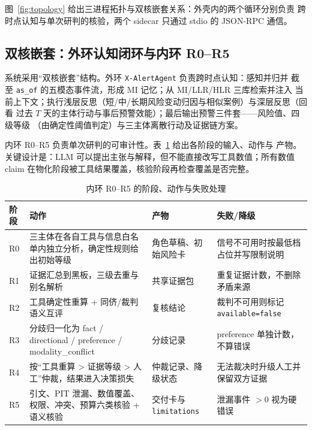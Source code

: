 \documentclass[UTF8,fontset=fandol,11pt,a4paper]{ctexart}
\begin{document}
图~\ref{fig:topology} 给出三进程拓扑与双核嵌套关系：外壳内的两个循环分别负责
跨时点认知与单次研判的核验，两个 sidecar 只通过 stdio 的 JSON-RPC 通信。

\subsection{双核嵌套：外环认知闭环与内环 R0--R5}

系统采用“双核嵌套”结构。外环 \texttt{X-AlertAgent} 负责跨时点认知：感知并归并
截至 \texttt{as\_of} 的五模态事件流，形成 MI 记忆；从 MI/LLR/HLR 三库检索并注入
当前上下文；执行浅层反思（短/中/长期风险变动归因与相似案例）与深层反思（回看
过去 $T$ 天的主体行动与事后预警效能）；最后输出预警三件套——风险值、四级等级
（由确定性阈值判定）与三主体离散行动及证据链方案。

内环 R0--R5 负责单次研判的可审计性。表~\ref{tab:r0r5} 给出各阶段的输入、动作与
产物。关键设计是：LLM 可以提出主张与解释，但不能直接改写工具数值；所有数值 claim
在物化阶段被工具结果覆盖，核验阶段再检查覆盖是否完整。

\begin{table}[t]
\centering
\caption{内环 R0--R5 的阶段、动作与失败处理}
\label{tab:r0r5}
\footnotesize
\setlength{\tabcolsep}{4pt}
\begin{tabular}{>{\raggedright\arraybackslash}p{1.1cm}
                >{\raggedright\arraybackslash}p{4.0cm}
                >{\raggedright\arraybackslash}p{4.2cm}
                >{\raggedright\arraybackslash}p{4.2cm}}
\toprule
阶段 & 动作 & 产物 & 失败/降级 \\
\midrule
R0 & 三主体在各自工具与信息白名单内独立分析，确定性规则给出初始等级 &
角色草稿、初始风险卡 & 信号不可用时按最低档占位并写限制说明 \\
R1 & 证据汇总到黑板，三级去重与别名解析 & 共享证据包 & 重复证据计数，不删除矛盾来源 \\
R2 & 工具确定性重算 + 同侪/裁判语义互评 & 复核结论 & 裁判不可用则标记 \texttt{available=false} \\
R3 & 分歧归一化为 fact / directional / preference / modality\_conflict &
分歧记录 & preference 单独计数，不算错误 \\
R4 & 按“工具重算 > 证据等级 > 人工”仲裁，结果进入决策损失 & 仲裁记录、降级状态 &
无法裁决时升级人工并保留双方证据 \\
R5 & 引文、PIT 泄漏、数值覆盖、权限、冲突、预算六类核验 + 语义核验 &
交付卡与 \texttt{limitations} & 泄漏事件 $>0$ 视为硬错误 \\
\bottomrule
\end{tabular}
\end{table}
\end{document}
